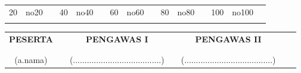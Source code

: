 \documentclass[12pt]{article}
\begin{document}
\begin{table}[]
\begin{tabular}{lllllllllllllll}
\multicolumn{1}{|l|}{20} & 
\multicolumn{1}{l|}{no20}        & 
\multicolumn{1}{l|}{} & 
\multicolumn{1}{l|}{40} & 
\multicolumn{1}{l|}{no40}        & 
\multicolumn{1}{l|}{} & 
\multicolumn{1}{l|}{60} & 
\multicolumn{1}{l|}{no60}        & 
\multicolumn{1}{l|}{} & 
\multicolumn{1}{l|}{80} & 
\multicolumn{1}{l|}{no80}        & 
\multicolumn{1}{l|}{} & 
\multicolumn{1}{l|}{100} & 
\multicolumn{1}{l|}{no100}        &  \\ \cline{1-2} \cline{4-5} \cline{7-8} \cline{10-11} \cline{13-14}
                         &                              &                       &                         &                              &                       &                         &                              &                       &                         &                              &                       &                          &                              &  \\                                              
\end{tabular}
\end{table}
\begin{table}[]
\centering
\vspace{-2cm}
\begin{tabular}{cm{0.5cm}cm{0.5cm}ccc}
\textbf{PESERTA} & \textbf{} & \textbf{PENGAWAS I} & \textbf{} & \textbf{PENGAWAS II} \\ 
 &  &  &  &  \\ 
 &  &  &  &  \\ 
(a.nama) &  & (......................................) &  & (......................................) \\ 
\end{tabular}
\end{table}


\end{document}

